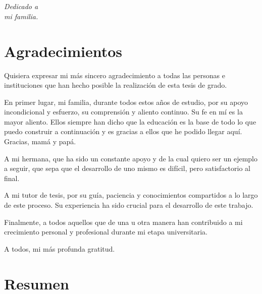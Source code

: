 \documentclass[a4paper, 12pt]{book}
\begin{document}

\chapter*{}
\begin{flushright}
\textit{Dedicado a \\
mi familia.}
\end{flushright}


\chapter*{Agradecimientos}

Quisiera expresar mi más sincero agradecimiento a todas las personas e instituciones que han hecho posible la realización de esta tesis de grado.

En primer lugar, mi familia, durante todos estos años de estudio, por su apoyo incondicional y esfuerzo, su comprensión y aliento continuo. 
Su fe en mí es la mayor aliento. 
Ellos siempre han dicho que la educación es la base de todo lo que puedo construir a continuación y es gracias a ellos que he podido llegar aquí. Gracias, mamá y papá.

A mi hermana, que ha sido un constante apoyo y de la cual quiero ser un ejemplo a seguir, que sepa que el desarrollo de uno mismo es difícil, pero satisfactorio al final.

A mi tutor de tesis, por su guía, paciencia y conocimientos compartidos a lo largo de este proceso. Su experiencia ha sido crucial para el desarrollo de este trabajo.

Finalmente, a todos aquellos que de una u otra manera han contribuido a mi crecimiento personal y profesional durante mi etapa universitaria.

A todos, mi más profunda gratitud.



\chapter*{Resumen}
\end{document}

